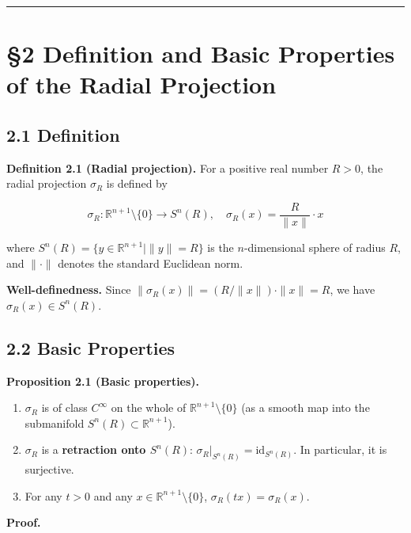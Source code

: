 \documentclass[
]{ltjsarticle}
\begin{document}
\begin{center}\rule{0.5\linewidth}{0.5pt}\end{center}

\section{§2 Definition and Basic Properties of the Radial
Projection}\label{definition-and-basic-properties-of-the-radial-projection}

\subsection{2.1 Definition}\label{definition}

\textbf{Definition 2.1 (Radial projection).} For a positive real number
\(R > 0\), the radial projection \(\sigma_R\) is defined by

\[\sigma_R: \mathbb{R}^{n+1} \setminus \{0\} \to S^n(R), \quad \sigma_R(x) = \frac{R}{\|x\|} \cdot x \tag{2.1}\]

where \(S^n(R) = \{y \in \mathbb{R}^{n+1} \mid \|y\| = R\}\) is the
\(n\)-dimensional sphere of radius \(R\), and \(\|\cdot\|\) denotes the
standard Euclidean norm.

\textbf{Well-definedness.} Since
\(\|\sigma_R(x)\| = (R/\|x\|) \cdot \|x\| = R\), we have
\(\sigma_R(x) \in S^n(R)\).

\subsection{2.2 Basic Properties}\label{basic-properties}

\textbf{Proposition 2.1 (Basic properties).}

\begin{enumerate}
\def\labelenumi{(\roman{enumi})}
\item
  \(\sigma_R\) is of class \(C^\infty\) on the whole of
  \(\mathbb{R}^{n+1} \setminus \{0\}\) (as a smooth map into the
  submanifold \(S^n(R) \subset \mathbb{R}^{n+1}\)).
\item
  \(\sigma_R\) is a \textbf{retraction onto \(S^n(R)\)}:
  \(\sigma_R \big|_{S^n(R)} = \mathrm{id}_{S^n(R)}\). In particular, it
  is surjective.
\item
  For any \(t > 0\) and any \(x \in \mathbb{R}^{n+1} \setminus \{0\}\),
  \(\sigma_R(tx) = \sigma_R(x)\).
\end{enumerate}

\textbf{Proof.}
\end{document}
